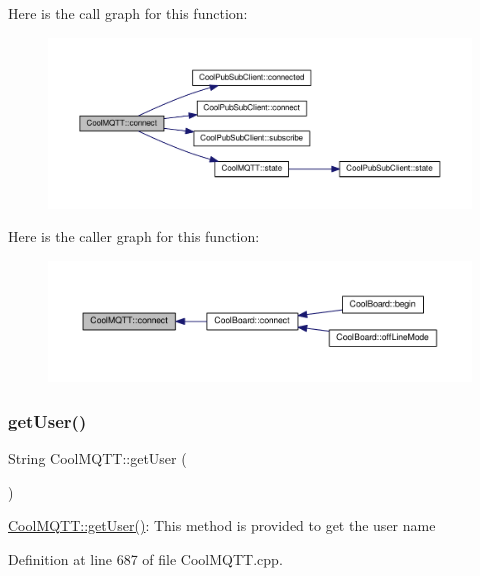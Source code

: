 Here is the call graph for this function\+:\nopagebreak
\begin{figure}[H]
\begin{center}
\leavevmode
\includegraphics[width=350pt]{d0/dd0/class_cool_m_q_t_t_a50075d0ab23a327ab897fd6adad20eda_cgraph}
\end{center}
\end{figure}
Here is the caller graph for this function\+:\nopagebreak
\begin{figure}[H]
\begin{center}
\leavevmode
\includegraphics[width=350pt]{d0/dd0/class_cool_m_q_t_t_a50075d0ab23a327ab897fd6adad20eda_icgraph}
\end{center}
\end{figure}
\mbox{\label{class_cool_m_q_t_t_a373cc92fca7760d886f02d8a6e5b3f63}} 
\subsubsection{\texorpdfstring{get\+User()}{getUser()}}
{\footnotesize\ttfamily String Cool\+M\+Q\+T\+T\+::get\+User (\begin{DoxyParamCaption}{ }\end{DoxyParamCaption})}

\hyperlink{class_cool_m_q_t_t_a373cc92fca7760d886f02d8a6e5b3f63}{Cool\+M\+Q\+T\+T\+::get\+User()}\+: This method is provided to get the user name 

Definition at line 687 of file Cool\+M\+Q\+T\+T.\+cpp.


